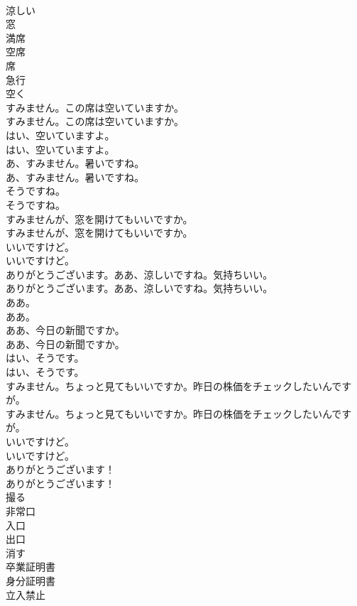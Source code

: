\documentclass[8pt]{extreport}
\begin{document}
\begin{CJK}{UTF8}{min}
\\	涼しい
\\	窓
\\	満席
\\	空席
\\	席
\\	急行
\\	空く
\\	すみません。この席は空いていますか。	
\\	すみません。この席は空いていますか。 
\\	はい、空いていますよ。	
\\	はい、空いていますよ。 
\\	あ、すみません。暑いですね。	
\\	あ、すみません。暑いですね。 
\\	そうですね。	
\\	そうですね。 
\\	すみませんが、窓を開けてもいいですか。	
\\	すみませんが、窓を開けてもいいですか。 
\\	いいですけど。	
\\	いいですけど。 
\\	ありがとうございます。ああ、涼しいですね。気持ちいい。	
\\	ありがとうございます。ああ、涼しいですね。気持ちいい。 
\\	ああ。	
\\	ああ。 
\\	ああ、今日の新聞ですか。	
\\	ああ、今日の新聞ですか。 
\\	はい、そうです。	
\\	はい、そうです。 
\\	すみません。ちょっと見てもいいですか。昨日の株価をチェックしたいんですが。	
\\	すみません。ちょっと見てもいいですか。昨日の株価をチェックしたいんですが。 
\\	いいですけど。	
\\	いいですけど。 
\\	ありがとうございます！	
\\	ありがとうございます！ 
\\	撮る
\\	非常口
\\	入口
\\	出口
\\	消す
\\	卒業証明書
\\	身分証明書
\\	立入禁止

\end{CJK}
\end{document}

